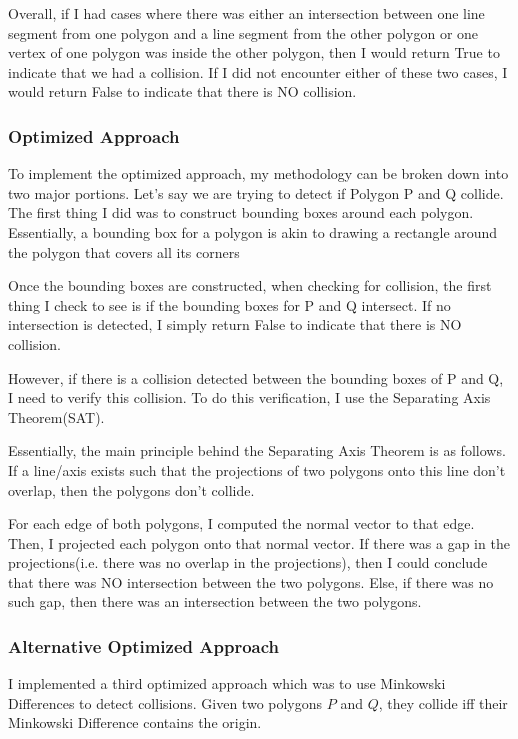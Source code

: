 \documentclass{article}
\begin{document}
Overall, if I had cases where there was either an intersection between one line segment from one polygon and a line segment from the other polygon or one vertex of one polygon was inside the other polygon, then I would return True to indicate that we had a collision. If I did not encounter either of these two cases, I would return False to indicate that there is NO collision.  

\subsubsection{Optimized Approach}
To implement the optimized approach, my methodology can be broken down into two major portions. Let's say we are trying to detect if Polygon P and Q collide. The first thing I did was to construct bounding boxes around each polygon. Essentially, a bounding box for a polygon is akin to drawing a rectangle around the polygon that covers all its corners \newline 

Once the bounding boxes are constructed, when checking for collision, the first thing I check to see is if the bounding boxes for P and Q intersect. If no intersection is detected, I simply return False to indicate that there is NO collision. \newline 

However, if there is a collision detected between the bounding boxes of P and Q, I need to verify this collision. To do this verification, I use the Separating Axis Theorem(SAT). \newline 

Essentially, the main principle behind the Separating Axis Theorem is as follows. If a line/axis exists such that the projections of two polygons onto this line don't overlap, then the polygons don't collide. \newline 

For each edge of both polygons, I computed the normal vector to that edge. Then, I projected each polygon onto that normal vector. If there was a gap in the projections(i.e. there was no overlap in the projections), then I could conclude that there was NO intersection between the two polygons. Else, if there was no such gap, then there was an intersection between the two polygons. 

\subsubsection{Alternative Optimized Approach}
I implemented a third optimized approach which was to use Minkowski Differences to detect collisions. Given two polygons $P$ and $Q$, they collide iff their Minkowski Difference contains the origin. \newline 
\end{document}
